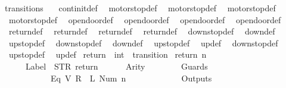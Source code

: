 \begin{isabellebody}
\isanewline
\isanewline
\isanewline
\isanewline
{}\isamarkupfalse%
\ transitions\ {\isacharequal}\isanewline
\ \ continit{\isacharunderscore}def\isanewline
\ \ motorstop{}{\isacharunderscore}def\isanewline
\ \ motorstop{}{\isacharunderscore}def\isanewline
\ \ motorstop{}{\isacharunderscore}def\isanewline
\ \ motorstop{}{\isacharunderscore}def\isanewline
\ \ opendoor{}{\isacharunderscore}def\isanewline
\ \ opendoor{}{\isacharunderscore}def\isanewline
\ \ opendoor{}{\isacharunderscore}def\isanewline
\ \ opendoor{}{\isacharunderscore}def\isanewline
\ \ return{}{\isacharunderscore}def\isanewline
\ \ return{}{\isacharunderscore}def\isanewline
\ \ return{}{\isacharunderscore}def\isanewline
\ \ return{}{\isacharunderscore}def\isanewline
\ \ down{}{}stop{\isacharunderscore}def\isanewline
\ \ down{}{}{\isacharunderscore}def\isanewline
\ \ up{}{}stop{\isacharunderscore}def\isanewline
\ \ down{}{}stop{\isacharunderscore}def\isanewline
\ \ down{}{}{\isacharunderscore}def\isanewline
\ \ up{}{}stop{\isacharunderscore}def\isanewline
\ \ up{}{}{\isacharunderscore}def\isanewline
\ \ down{}{}stop{\isacharunderscore}def\isanewline
\ \ up{}{}stop{\isacharunderscore}def\isanewline
\ \ up{}{}{\isacharunderscore}def\isanewline
\isanewline
{}\isamarkupfalse%
\ return\ {\isacharcolon}{\isacharcolon}\ {\isachardoublequoteopen}int\ {\isasymRightarrow}\ transition{\isachardoublequoteclose}\ \isanewline
{\isachardoublequoteopen}return\ n\ {\isasymequiv}\ {\isasymlparr}\isanewline
\ \ \ \ \ \ Label\ {\isacharequal}\ STR\ {\isacharprime}{\isacharprime}return{\isacharprime}{\isacharprime}{\isacharcomma}\isanewline
\ \ \ \ \ \ Arity\ {\isacharequal}\ {}{\isacharcomma}\isanewline
\ \ \ \ \ \ Guards\ {\isacharequal}\ {\isacharbrackleft}\isanewline
\ \ \ \ \ \ \ \ \ \ \ \ {\isacharparenleft}Eq\ {\isacharparenleft}V\ {\isacharparenleft}R\ {}{\isacharparenright}{\isacharparenright}\ {\isacharparenleft}L\ {\isacharparenleft}Num\ n{\isacharparenright}{\isacharparenright}{\isacharparenright}\isanewline
\ \ \ \ \ \ {\isacharbrackright}{\isacharcomma}\isanewline
\ \ \ \ \ \ Outputs\ {\isacharequal}\ {\isacharbrackleft}{\isacharbrackright}{\isacharcomma}\isanewline

\end{isabellebody}
